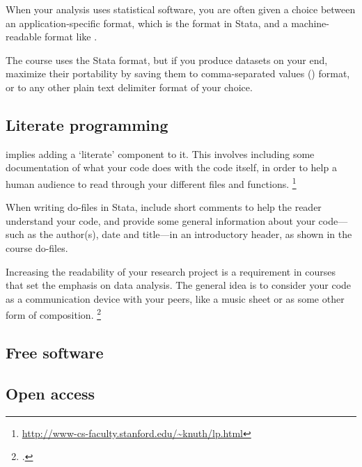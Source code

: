 When your analysis uses statistical software, you are often given a choice between an application-specific format, which is the  format in Stata, and a machine-readable format like .%

The course uses the Stata format, but if you produce datasets on your end, maximize their portability by saving them to comma-separated values () format, or to any other plain text delimiter format of your choice.%

%
%
\subsection{Literate programming}%

 implies adding a `literate' component to it. This involves including some documentation of what your code does with the code itself, in order to help a human audience to read through your different files and functions.%
  \footnote{\url{http://www-cs-faculty.stanford.edu/~knuth/lp.html}} %

When writing do-files in Stata, include short comments to help the reader understand your code, and provide some general information about your code—such as the author(s), date and title—in an introductory header, as shown in the course do-files.%

Increasing the readability of your research project is a requirement in courses that set the emphasis on data analysis. The general idea is to consider your code as a communication device with your peers, like a music sheet or as some other form of composition.%
  \footcite{WickhamGrolemund:2013} %

%
%
\subsection{Free software}%


%
%
\subsection{Open access}%



%
%